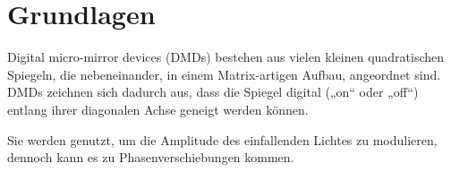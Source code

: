 \section{Grundlagen}

Digital micro-mirror devices (DMDs) bestehen aus vielen kleinen quadratischen Spiegeln, die nebeneinander, in einem Matrix-artigen Aufbau, angeordnet sind. DMDs zeichnen sich dadurch aus, dass die Spiegel digital („on“ oder „off“) entlang ihrer diagonalen Achse geneigt werden können.

Sie werden genutzt, um die Amplitude des einfallenden Lichtes zu modulieren, dennoch kann es zu Phasenverschiebungen kommen. \cite{wfs_dmd}